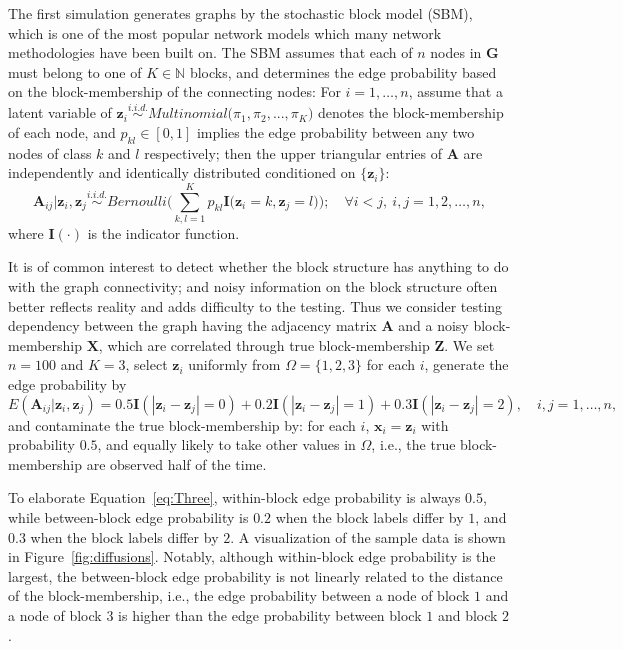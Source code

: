 \documentclass[12pt]{article}
\theoremstyle{definition}
\begin{document}
	The first simulation generates graphs by the stochastic block model (SBM), which is one of the most popular network models which many network methodologies have been built on. The SBM assumes that each of $n$ nodes in $\mathbf{G}$ must belong to one of $K \in \mathbb{N}$ blocks, and determines the edge probability based on the block-membership of the connecting nodes: For $i=1,\ldots,n$, assume that a latent variable of $\mathbf{z}_{i} \overset{i.i.d.}{\sim} Multinomial\big( \pi_{1}, \pi_{2}, ... , \pi_{K} \big)$ denotes the block-membership of each node, and $p_{kl} \in [0,1]$ implies the edge probability between any two nodes of class $k$ and $l$ respectively; then the upper triangular entries of $\mathbf{A}$ are independently and identically distributed conditioned on $\{\mathbf{z}_{i}\}$:
	\begin{equation} 
		\mathbf{A}_{ij} \big| \mathbf{z}_{i}, \mathbf{z}_{j} \overset{i.i.d.}{\sim} Bernoulli\big( \sum\limits_{k,l=1}^{K} p_{kl} \mathbf{I} \big( \mathbf{z}_{i} = k, \mathbf{z}_{j} = l  \big)    \big); \quad \forall  i < j,~i,j = 1,2, \ldots, n,
	\end{equation}
	where $\mathbf{I}(\cdot)$ is the indicator function. %
	
	It is of common interest to detect whether the block structure has anything to do with the graph connectivity; and noisy information on the block structure often better reflects reality and adds difficulty to the testing. Thus we consider testing dependency between the graph having the adjacency matrix $\mathbf{A}$ and a noisy block-membership $\mathbf{X}$, which are correlated through true block-membership $\mathbf{Z}$. We set $n=100$ and $K=3$, select $\mathbf{z}_i$ uniformly from $\Omega=\{1,2,3\}$ for each $i$, generate the edge probability by
	\begin{equation}
		\label{eq:Three}
		E(\mathbf{A}_{ij} | \mathbf{z}_{i}, \mathbf{z}_{j}) = 0.5 \mathbf{I}(|\mathbf{z}_{i} - \mathbf{z}_{j}| = 0) + 0.2 \mathbf{I}(|\mathbf{z}_{i} - \mathbf{z}_{j}| = 1) + 0.3 \mathbf{I}(|\mathbf{z}_{i} - \mathbf{z}_{j}| = 2), \quad i,j = 1, \ldots, n,
	\end{equation} 
	and contaminate the true block-membership by: for each $i$, $\mathbf{x}_{i}=\mathbf{z}_{i}$ with probability $0.5$, and equally likely to take other values in $\Omega$, i.e., the true block-membership are observed half of the time.
	
	To elaborate Equation~\ref{eq:Three}, within-block edge probability is always $0.5$, while between-block edge probability is $0.2$ when the block labels differ by $1$, and $0.3$ when the block labels differ by $2$. A visualization of the sample data is shown in Figure~\ref{fig:diffusions}. 
	Notably, although within-block edge probability is the largest, the between-block edge probability is not linearly related to the distance of the block-membership, i.e., the edge probability between a node of block $1$ and a node of block $3$ is higher than the edge probability between block $1$ and block $2$. 
	
\end{document}
